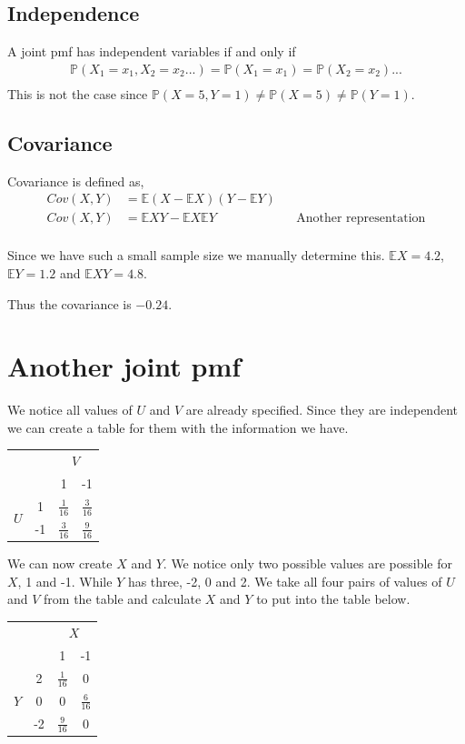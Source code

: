 \documentclass{article}
\newcommand{\prob}{\mathbb{P}}
\newcommand{\expect}{\mathbb{E}}
\begin{document}
\subsection{Independence}
A joint pmf has independent variables if and only if
\begin{align*}
    \prob(X_1=x_1, X_2=x_2...) = \prob(X_1=x_1) = \prob(X_2=x_2)... \\
\end{align*}
This is not the case since $\prob(X = 5, Y = 1) \neq \prob(X=5)
\neq \prob(Y=1)$.

\subsection{Covariance}
Covariance is defined as,
\begin{align*}
    Cov(X,Y) &= \expect(X - \expect X)(Y - \expect Y) \\
    Cov(X,Y) &= \expect XY - \expect X \expect Y
    && \text{Another representation} \\
\end{align*}

Since we have such a small sample size we manually determine this.
$\expect X = 4.2$, $\expect Y = 1.2$ and $\expect XY = 4.8$.

Thus the covariance is $-0.24$.

\section{Another joint pmf}
We notice all values of $U$ and $V$ are already specified. Since they are
independent we can create a table for them with the information we have.
\begin{center}
\begin{tabular}{ c c|c c  }
    & & \multicolumn{2}{c}{$V$} \\
    & & 1 & -1\\
    \hline
    \multirow{2}{*}{$U$} & 1 & $\frac{1}{16}$ & $\frac{3}{16}$ \\
    & -1 & $\frac{3}{16}$ & $\frac{9}{16}$ \\
\end{tabular}
\end{center}

We can now create $X$ and $Y$.
We notice only two possible values are possible for $X$, 1 and -1. While
$Y$ has three, -2, 0 and 2. We take all four pairs of values of $U$ and $V$
from the table and calculate $X$ and $Y$ to put into the table below.
\begin{center}
\begin{tabular}{ c c|c c  }
    & & \multicolumn{2}{c}{$X$} \\
    & & 1 & -1\\
    \hline
    \multirow{3}{*}{$Y$} & 2 & $\frac{1}{16}$ & 0 \\
    & 0 & 0 & $\frac{6}{16}$ \\
    & -2 & $\frac{9}{16}$ & 0 \\
\end{tabular}
\end{center}
\end{document}
